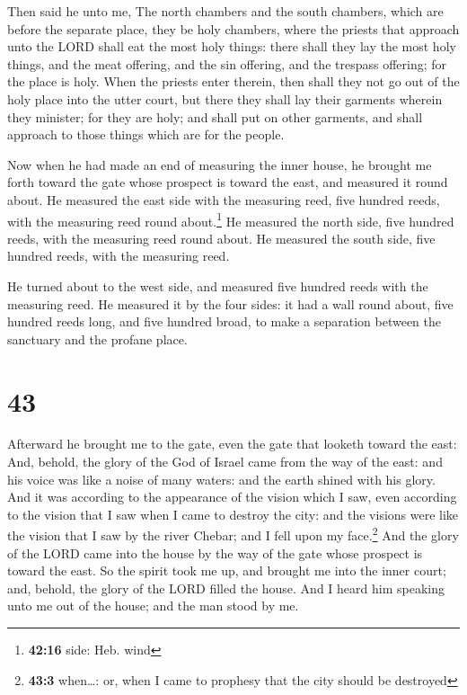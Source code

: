  Then said he unto me, The north chambers and the south
chambers, which are before the separate place, they be holy chambers,
where the priests that approach unto the LORD shall eat the most holy
things: there shall they lay the most holy things, and the meat
offering, and the sin offering, and the trespass offering; for the place
is holy.  When the priests enter therein, then shall they
not go out of the holy place into the utter court, but there they shall
lay their garments wherein they minister; for they are holy; and shall
put on other garments, and shall approach to those things which are for
the people.

 Now when he had made an end of measuring the inner
house, he brought me forth toward the gate whose prospect is toward the
east, and measured it round about.  He measured the east
side with the measuring reed, five hundred reeds, with the measuring
reed round about.\footnote{\textbf{42:16} side: Heb. wind}
 He measured the north side, five hundred reeds, with the
measuring reed round about.  He measured the south side,
five hundred reeds, with the measuring reed.

 He turned about to the west side, and measured five
hundred reeds with the measuring reed.  He measured it by
the four sides: it had a wall round about, five hundred reeds long, and
five hundred broad, to make a separation between the sanctuary and the
profane place.

\hypertarget{section-42}{%
\section{43}\label{section-42}}

 Afterward he brought me to the gate, even the gate that
looketh toward the east:  And, behold, the glory of the
God of Israel came from the way of the east: and his voice was like a
noise of many waters: and the earth shined with his glory.
 And it was according to the appearance of the vision
which I saw, even according to the vision that I saw when I came to
destroy the city: and the visions were like the vision that I saw by the
river Chebar; and I fell upon my face.\footnote{\textbf{43:3}
  when\ldots: or, when I came to prophesy that the city should be
  destroyed}  And the glory of the LORD came into the
house by the way of the gate whose prospect is toward the east.
 So the spirit took me up, and brought me into the inner
court; and, behold, the glory of the LORD filled the house.
 And I heard him speaking unto me out of the house; and
the man stood by me.

